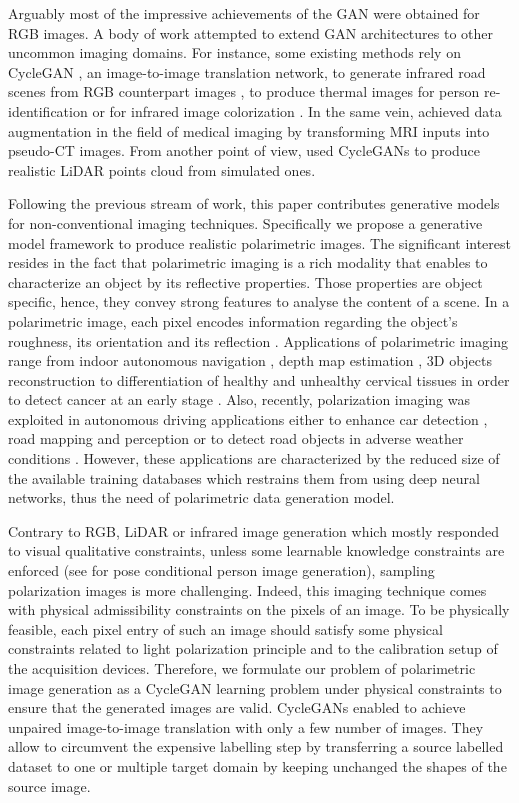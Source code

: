 Arguably most of the impressive achievements of the GAN were obtained for RGB images. A body of work attempted to extend GAN architectures to other uncommon imaging domains. For instance, some existing methods rely on CycleGAN \citep{Zhu2017a}, an image-to-image translation network, to generate infrared road scenes from RGB counterpart images \citep{Zhang2018b}, to produce thermal images for person re-identification \cite{Knia2018} or for infrared image colorization \cite{Mehri2019}. In the same vein,  \citet{Nie2017} achieved data augmentation in the field of medical imaging by transforming MRI inputs into pseudo-CT images.  From another point of view, \citet{Sallab2019} used CycleGANs to produce realistic LiDAR points cloud from simulated ones. 


Following the previous stream of work, this paper contributes generative models for non-conventional imaging techniques. Specifically we propose a  generative model framework to produce realistic polarimetric images.  The significant interest resides in the fact that polarimetric imaging is a rich modality that enables to characterize an object by its reflective properties. Those properties are object specific, hence, they convey strong features to analyse the content of a scene. In a polarimetric image, each pixel encodes information regarding the object's roughness, its orientation and its reflection \citep{Wolff1995}. Applications of polarimetric imaging range from indoor autonomous navigation \citep{Berger2017}, depth map estimation \citep{Zhu2019}, 3D objects reconstruction \citep{Morel2006} to differentiation of healthy and unhealthy cervical tissues in order to detect cancer at an early stage \citep{Rehbinder2016}. Also, recently, polarization imaging was exploited in autonomous driving applications either to enhance car detection \citep{Fan2018}, road mapping and perception \citep{Aycock2017} or to detect road objects in adverse weather conditions \citep{Blin2019}.  However, these  applications are characterized by the reduced size of the available training databases which restrains them from using deep neural networks, thus the need of polarimetric data generation model. 

Contrary to RGB, LiDAR or infrared image generation which mostly responded to visual qualitative  constraints, unless some learnable knowledge constraints are enforced (see \cite{Hu2018} for pose conditional person image generation), sampling polarization images is more challenging. Indeed, this imaging technique comes with physical admissibility constraints on the pixels of an image. To be physically feasible, each pixel entry of such an image should satisfy some physical constraints related to light polarization principle and to the calibration setup of the acquisition devices.
Therefore, we formulate our problem of polarimetric image generation as a CycleGAN learning problem under physical constraints to ensure that the generated images are valid. CycleGANs \citep{Zhu2017a} enabled to achieve unpaired image-to-image translation with only a few number of images. 
They allow to circumvent the expensive labelling step by transferring a source labelled dataset to one or multiple target domain \citep{Almahairi2018} by keeping unchanged the shapes of the source image. 


